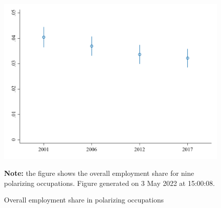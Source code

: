 \begin{figure}[!h]
\centering
\caption{Overall employment share in polarizing occupations}
\includegraphics[width=.5\textwidth]{../results/figures//empshare_in_polarizing_occupations.png}
\par \begin{minipage}[h]{\textwidth}{\scriptsize\textbf{Note:} the figure shows the overall employment share for nine polarizing occupations. Figure generated on  3 May 2022 at 15:00:08.}\end{minipage}
\end{figure}
